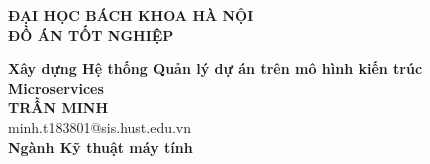 \documentclass[DoAn.tex]{subfiles}
\begin{document}
\begin{titlepage}
  \thispagestyle{empty}
  \begin{center}

    {\textbf{\large{ĐẠI HỌC BÁCH KHOA HÀ NỘI}}}\\[4cm]

    {\textbf{\huge{ ĐỒ ÁN TỐT NGHIỆP}}}\\[1cm]
    {\textbf{\Large{Xây dựng Hệ thống Quản lý dự án trên mô hình kiến trúc Microservices}}\\[1cm]

    {\textbf{\large{TRẦN MINH}}}\\
    {\large{minh.t183801@sis.hust.edu.vn}}\\[0.5cm]

    {\textbf{\large{Ngành Kỹ thuật máy tính}}}\\

    \vspace{2cm}
    \begin{table}[H]
      \centering
    \end{table}}
  \end{center}



\end{titlepage}
\end{document}
